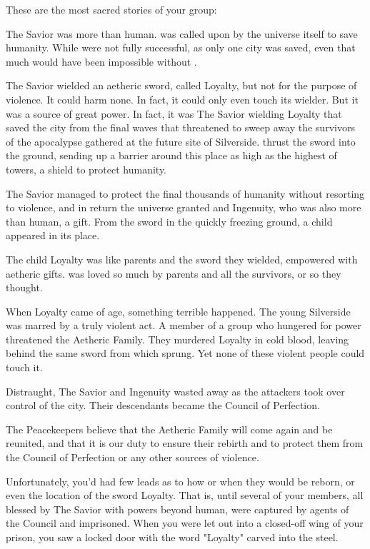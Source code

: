 \documentclass[blue]{Silversiders}
\begin{document}
These are the most sacred stories of your group:
\begin{itemz}
	\item The Savior was more than human. \cSavior{\They} was called upon by the universe itself to save humanity. While \cSavior{\they} were not fully successful, as only one city was saved, even that much would have been impossible without \cSavior{\them}.
	\item The Savior wielded an aetheric sword, called Loyalty, but not for the purpose of violence. It could harm none. In fact, it could only even touch its wielder. But it was a source of great power. In fact, it was The Savior wielding Loyalty that saved the city from the final waves that threatened to sweep away the survivors of the apocalypse gathered at the future site of Silverside. \cSavior{\They} thrust the sword into the ground, sending up a barrier around this place as high as the highest of towers, a shield to protect humanity.
	\item The Savior managed to protect the final thousands of humanity without resorting to violence, and in return the universe granted \cSavior{\them} and \cSavior{\their} \cIngenuityOld{\spouse} Ingenuity, who was also more than human, a gift. From the sword in the quickly freezing ground, a child appeared in its place.
	\item The child Loyalty was like \cLoyalty{\their} parents and the sword they wielded, empowered with aetheric gifts. \cLoyalty{\They} was loved so much by \cLoyalty{\their} parents and all the survivors, or so they thought.
	\item When Loyalty came of age, something terrible happened. The young Silverside was marred by a truly violent act. A member of a group who hungered for power threatened the Aetheric Family. They murdered Loyalty in cold blood, leaving behind the same sword from which \cLoyalty{\they} sprung. Yet none of these violent people could touch it.
	\item Distraught, The Savior and Ingenuity wasted away as the attackers took over control of the city. Their descendants became the Council of Perfection.
	\item The Peacekeepers believe that the Aetheric Family will come again and be reunited, and that it is our duty to ensure their rebirth and to protect them from the Council of Perfection or any other sources of violence.

\end{itemz}

Unfortunately, you'd had few leads as to how or when they would be reborn, or even the location of the sword Loyalty. That is, until several of your members, all blessed by The Savior with powers beyond human, were captured by agents of the Council and imprisoned. When you were let out into a closed-off wing of your prison, you saw a locked door with the word "Loyalty" carved into the steel.
\end{document}
